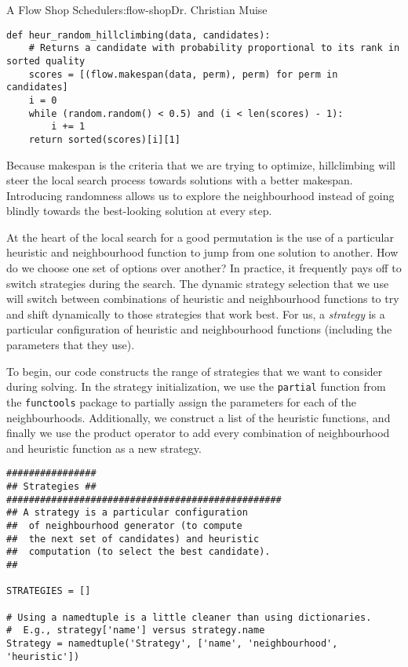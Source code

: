 \begin{aosachapter}{A Flow Shop Scheduler}{s:flow-shop}{Dr. Christian Muise}
\begin{verbatim}
def heur_random_hillclimbing(data, candidates):
    # Returns a candidate with probability proportional to its rank in sorted quality
    scores = [(flow.makespan(data, perm), perm) for perm in candidates]
    i = 0
    while (random.random() < 0.5) and (i < len(scores) - 1):
        i += 1
    return sorted(scores)[i][1]
\end{verbatim}

Because makespan is the criteria that we are trying to optimize,
hillclimbing will steer the local search process towards solutions with
a better makespan. Introducing randomness allows us to explore the
neighbourhood instead of going blindly towards the best-looking solution
at every step.

\label{dynamic-strategy-selection}

At the heart of the local search for a good permutation is the use of a
particular heuristic and neighbourhood function to jump from one
solution to another. How do we choose one set of options over another?
In practice, it frequently pays off to switch strategies during the
search. The dynamic strategy selection that we use will switch between
combinations of heuristic and neighbourhood functions to try and shift
dynamically to those strategies that work best. For us, a
\emph{strategy} is a particular configuration of heuristic and
neighbourhood functions (including the parameters that they use).

To begin, our code constructs the range of strategies that we want to
consider during solving. In the strategy initialization, we use the
\texttt{partial} function from the \texttt{functools} package to
partially assign the parameters for each of the neighbourhoods.
Additionally, we construct a list of the heuristic functions, and
finally we use the product operator to add every combination of
neighbourhood and heuristic function as a new strategy.

\begin{verbatim}
################
## Strategies ##
#################################################
## A strategy is a particular configuration
##  of neighbourhood generator (to compute
##  the next set of candidates) and heuristic
##  computation (to select the best candidate).
##

STRATEGIES = []

# Using a namedtuple is a little cleaner than using dictionaries.
#  E.g., strategy['name'] versus strategy.name
Strategy = namedtuple('Strategy', ['name', 'neighbourhood', 'heuristic'])


\end{verbatim}
\end{aosachapter}
